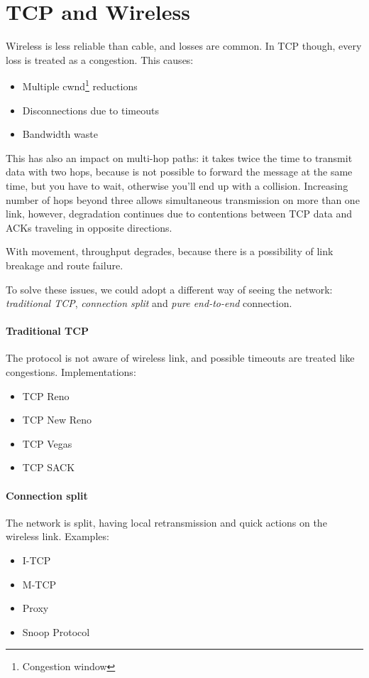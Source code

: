 \newpage
\section{TCP and Wireless}

Wireless is less reliable than cable, and losses are common. In TCP though,
every loss is treated as a congestion. This causes:
\begin{itemize}
\item Multiple cwnd\footnote{Congestion window} reductions
\item Disconnections due to timeouts
\item Bandwidth waste
\end{itemize}

This has also an impact on multi-hop paths: it takes twice the time to
transmit data with two hops, because is not possible to forward the message at
the same time, but you have to wait, otherwise you'll end up with a collision.
Increasing number of hops beyond three allows simultaneous transmission on more
than one link, however, degradation continues due to contentions between TCP
data and ACKs traveling in opposite directions.

With movement, throughput degrades, because there is a possibility of link
breakage and route failure.

To solve these issues, we could adopt a different way of seeing the network:
\textit{traditional TCP}, \textit{connection split} and
\textit{pure end-to-end} connection.

\paragraph*{Traditional TCP} The protocol is not aware of wireless link, and
possible timeouts are treated like congestions. Implementations:
\begin{itemize}
\item TCP Reno
\item TCP New Reno
\item TCP Vegas
\item TCP SACK
\end{itemize}

\paragraph*{Connection split} The network is split, having local
retransmission and quick actions on the wireless link.
Examples:
\begin{itemize}
\item I-TCP
\item M-TCP
\item Proxy
\item Snoop Protocol
\end{itemize}

